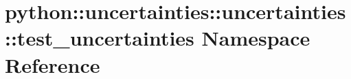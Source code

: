 \hypertarget{namespacepython_1_1uncertainties_1_1uncertainties_1_1test__uncertainties}{
\section{python::uncertainties::uncertainties::test\_\-uncertainties Namespace Reference}
\label{namespacepython_1_1uncertainties_1_1uncertainties_1_1test__uncertainties}
}
